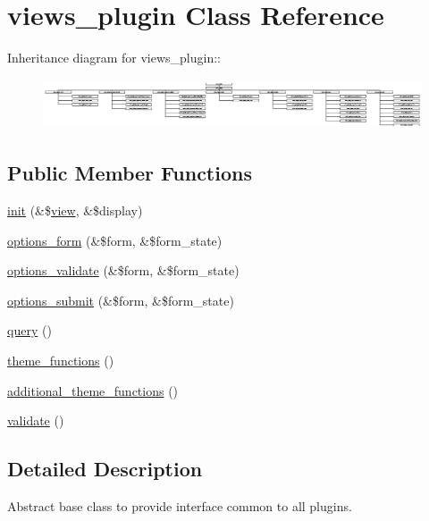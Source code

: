 \hypertarget{classviews__plugin}{
\section{views\_\-plugin Class Reference}
\label{classviews__plugin}
}
Inheritance diagram for views\_\-plugin::\begin{figure}[H]
\begin{center}
\leavevmode
\includegraphics[height=1.4966cm]{classviews__plugin}
\end{center}
\end{figure}
\subsection*{Public Member Functions}
\begin{CompactItemize}
\item 
\hyperlink{classviews__plugin_d6545806f1390625286446b426f1a489}{init} (\&\$\hyperlink{classview}{view}, \&\$display)
\item 
\hyperlink{classviews__plugin_1aaed8da1afd9f45293a37358c159837}{options\_\-form} (\&\$form, \&\$form\_\-state)
\item 
\hyperlink{classviews__plugin_46d72eb35feea36fed83cd1355a47431}{options\_\-validate} (\&\$form, \&\$form\_\-state)
\item 
\hyperlink{classviews__plugin_442b0f392deb52725ec8159e05654e06}{options\_\-submit} (\&\$form, \&\$form\_\-state)
\item 
\hyperlink{classviews__plugin_10ac07c47c4a8735786f9fcc38548587}{query} ()
\item 
\hyperlink{classviews__plugin_b20d2d49f24db9ee7f162341564fd2fd}{theme\_\-functions} ()
\item 
\hyperlink{classviews__plugin_5c5fb9783079362378d804c94b142b9f}{additional\_\-theme\_\-functions} ()
\item 
\hyperlink{classviews__plugin_af004b6a719837f08a1ffe4a1cf4d442}{validate} ()
\end{CompactItemize}


\subsection{Detailed Description}
Abstract base class to provide interface common to all plugins. 

